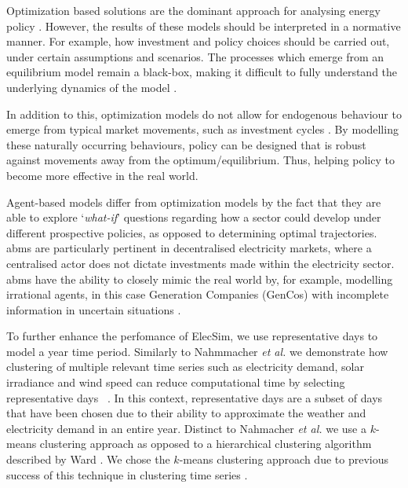 
Optimization based solutions are the dominant approach for analysing energy policy \cite{Chappin2017}. However, the results of these models should be interpreted in a normative manner. For example, how investment and policy choices should be carried out, under certain assumptions and scenarios. The processes which emerge from an equilibrium model remain a black-box, making it difficult to fully understand the underlying dynamics of the model \cite{Chappin2017}. 



In addition to this, optimization models do not allow for  endogenous behaviour to emerge from typical market movements, such as investment cycles \cite{Chappin2017, Gross2007}. By modelling these naturally occurring behaviours, policy can be designed that is robust against movements away from the optimum/equilibrium. Thus, helping policy to become more effective in the real world. 

Agent-based models differ from optimization models by the fact that they are able to explore `\textit{what-if}' questions regarding how a sector could develop under different prospective policies, as opposed to determining optimal trajectories. \acrshort{abm}s are particularly pertinent in decentralised electricity markets, where a centralised actor does not dictate investments made within the electricity sector. \acrshort{abm}s have the ability to closely mimic the real world by, for example, modelling irrational agents, in this case Generation Companies (GenCos) with incomplete information in uncertain situations \cite{Ghorbani2014}. 


To further enhance the perfomance of ElecSim, we use representative days to model a year time period. Similarly to Nahmmacher \textit{et al.} we demonstrate how clustering of multiple relevant time series such as electricity demand, solar irradiance and wind speed can reduce computational time by selecting representative days ~\cite{Nahmmacher2016}. In this context, representative days are a subset of days that have been chosen due to their ability to approximate the weather and electricity demand in an entire year. Distinct to Nahmacher \textit{et al.} we use a $k$-means clustering approach \cite{forgy65} as opposed to a hierarchical clustering algorithm described by Ward \cite{doi:10.1080/01621459.1963.10500845}. We chose the $k$-means clustering approach due to previous success of this technique in clustering time series \cite{Kell2018a}. 



